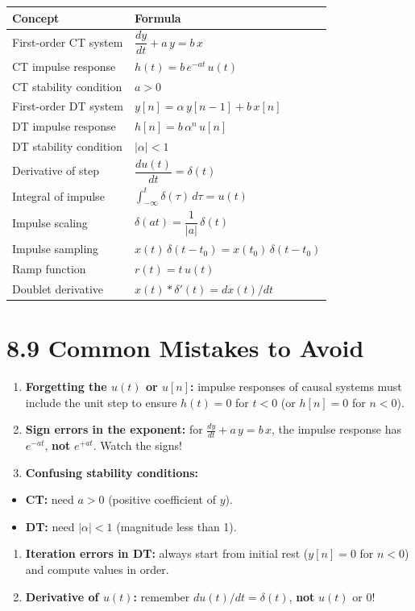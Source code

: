 \documentclass[11pt]{article}
\begin{document}
\begin{center}
\begin{tabular}{|l|l|}
\hline
\textbf{Concept} & \textbf{Formula} \\
\hline
First-order CT system & $\dfrac{dy}{dt} + a\,y = b\,x$ \\
\hline
CT impulse response & $h(t) = b\,e^{-at}\,u(t)$ \\
\hline
CT stability condition & $a > 0$ \\
\hline
First-order DT system & $y[n] = \alpha\,y[n-1] + b\,x[n]$ \\
\hline
DT impulse response & $h[n] = b\,\alpha^n\,u[n]$ \\
\hline
DT stability condition & $|\alpha| < 1$ \\
\hline
Derivative of step & $\dfrac{d u(t)}{dt} = \delta(t)$ \\
\hline
Integral of impulse & $\displaystyle\int_{-\infty}^{t}\delta(\tau)\,d\tau = u(t)$ \\
\hline
Impulse scaling & $\delta(at) = \dfrac{1}{|a|}\,\delta(t)$ \\
\hline
Impulse sampling & $x(t)\,\delta(t - t_0) = x(t_0)\,\delta(t - t_0)$ \\
\hline
Ramp function & $r(t) = t\,u(t)$ \\
\hline
Doublet derivative & $x(t)*\delta'(t) = dx(t)/dt$ \\
\hline
\end{tabular}
\end{center}

\section*{8.9 Common Mistakes to Avoid}

\begin{enumerate}
  \item \textbf{Forgetting the $u(t)$ or $u[n]$:} impulse responses of causal systems must include the unit step to ensure $h(t) = 0$ for $t<0$ (or $h[n] = 0$ for $n<0$).
  \item \textbf{Sign errors in the exponent:} for $\tfrac{dy}{dt} + a\,y = b\,x$, the impulse response has $e^{-at}$, \textbf{not} $e^{+at}$. Watch the signs!
  \item \textbf{Confusing stability conditions:}
\end{enumerate}
\begin{itemize}
  \item \textbf{CT:} need $a > 0$ (positive coefficient of $y$).
  \item \textbf{DT:} need $|\alpha| < 1$ (magnitude less than 1).
\end{itemize}
\begin{enumerate}
  \item \textbf{Iteration errors in DT:} always start from initial rest ($y[n] = 0$ for $n < 0$) and compute values in order.
  \item \textbf{Derivative of $u(t)$:} remember $du(t)/dt = \delta(t)$, \textbf{not} $u(t)$ or 0!
\end{enumerate}
\end{document}
